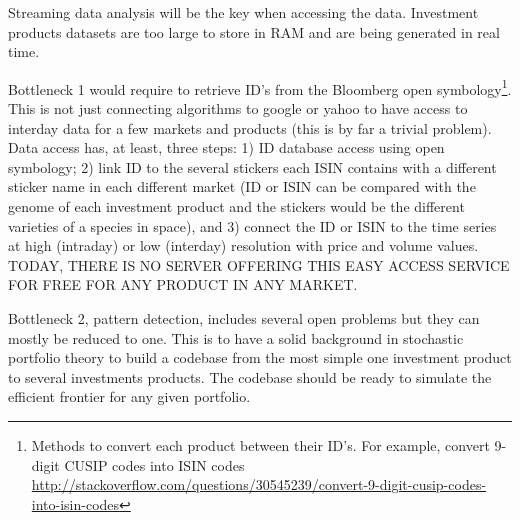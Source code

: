 \documentclass[english,12pt]{article}
\begin{document}





Streaming data analysis will be the key when accessing the
data. Investment products datasets are too large to store in RAM and
are being generated in real time.


Bottleneck 1 would require to retrieve ID's from the Bloomberg open
symbology\footnote{Methods to convert each product between their
  ID's. For example, convert 9-digit CUSIP codes into ISIN codes
  \url{http://stackoverflow.com/questions/30545239/convert-9-digit-cusip-codes-into-isin-codes}}. This
is not just connecting algorithms to google or yahoo to have access to
interday data for a few markets and products (this is by far a trivial
problem). Data access has, at least, three steps: 1) ID database
access using open symbology; 2) link ID to the several stickers each
ISIN contains with a different sticker name in each different market
(ID or ISIN can be compared with the genome of each investment product
and the stickers would be the different varieties of a species in
space), and 3) connect the ID or ISIN to the time series at high
(intraday) or low (interday) resolution with price and volume
values. TODAY, THERE IS NO SERVER OFFERING THIS EASY ACCESS SERVICE
FOR FREE FOR ANY PRODUCT IN ANY MARKET.


Bottleneck 2, pattern detection, includes several open problems but
they can mostly be reduced to one. This is to have a solid background
in stochastic portfolio theory  to build a codebase 
from the most simple one investment product to several investments
products. The codebase should be ready to simulate the efficient
frontier for any given portfolio.
\end{document}
